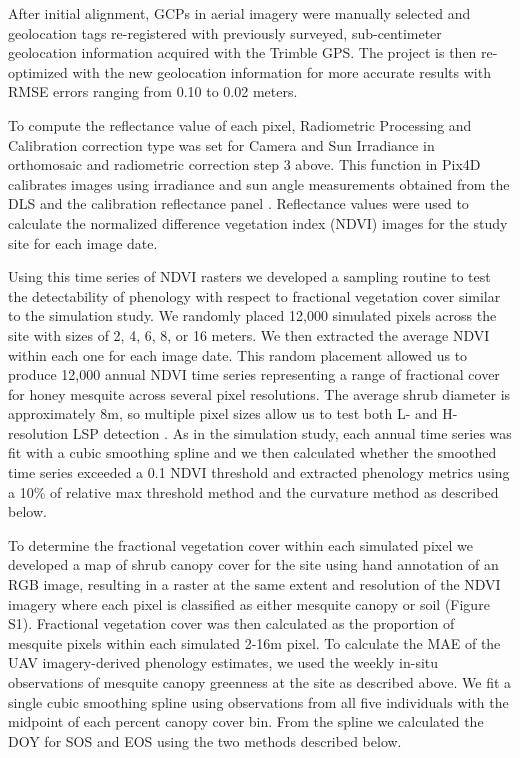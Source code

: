 \documentclass{article}
\begin{document}
After initial alignment, GCPs in aerial imagery were manually selected and geolocation tags re-registered with previously surveyed, sub-centimeter geolocation information acquired with the Trimble GPS. The project is then re-optimized with the new geolocation information for more accurate results with RMSE errors ranging from 0.10 to 0.02 meters.

To compute the reflectance value of each pixel, Radiometric Processing and Calibration correction type was set for Camera and Sun Irradiance in orthomosaic and radiometric correction step 3 above. This function in Pix4D calibrates images using irradiance and sun angle measurements obtained from the DLS and the calibration reflectance panel \cite{cao2019}. Reflectance values were used to calculate the normalized difference vegetation index (NDVI) images for the study site for each image date. 

Using this time series of NDVI rasters we developed a sampling routine to test the detectability of phenology with respect to fractional vegetation cover similar to the simulation study. We randomly placed 12,000 simulated pixels across the site with sizes of 2, 4, 6, 8, or 16 meters. We then extracted the average NDVI within each one for each image date. This random placement allowed us to produce 12,000 annual NDVI time series representing a range of fractional cover for honey mesquite across several pixel resolutions. The average shrub diameter is approximately 8m, so multiple pixel sizes allow us to test both L- and H-resolution LSP detection \cite{strahler1986}. As in the simulation study, each annual time series was fit with a cubic smoothing spline and we then calculated whether the smoothed time series exceeded a 0.1 NDVI threshold and extracted phenology metrics using a 10\% of relative max threshold method and the curvature method as described below. 

To determine the fractional vegetation cover within each simulated pixel we developed a map of shrub canopy cover for the site using hand annotation of an RGB image, resulting in a raster at the same extent and resolution of the NDVI imagery where each pixel is classified as either mesquite canopy or soil (Figure S1). Fractional vegetation cover was then calculated as the proportion of mesquite pixels within each simulated 2-16m pixel. To calculate the MAE of the UAV imagery-derived phenology estimates, we used the weekly in-situ observations of mesquite canopy greenness at the site as described above. We fit a single cubic smoothing spline using observations from all five individuals with the midpoint of each percent canopy cover bin. From the spline we calculated the DOY for SOS and EOS using the two methods described below. 
\end{document}
